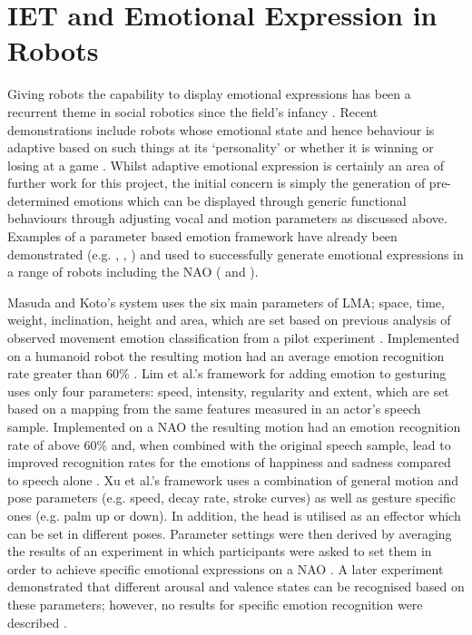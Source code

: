 \documentclass[11pt,a4paper]{report}
\begin{document}
\section{IET and Emotional Expression in Robots}
Giving robots the capability to display emotional expressions has been a recurrent theme in social robotics since the field's infancy \cite{breazeal1999build}. Recent demonstrations include robots whose emotional state and hence behaviour is adaptive based on such things at its `personality' \cite{park2009robot} or whether it is winning or losing at a game \cite{tielman2014adaptive}. Whilst adaptive emotional expression is certainly an area of further work for this project, the initial concern is simply the generation of pre-determined emotions which can be displayed through generic functional behaviours through adjusting vocal and motion parameters as discussed above. Examples of a parameter based emotion framework have already been demonstrated (e.g. \cite{masuda2010motion}, \cite{lim2011converting}, \cite{xu2013mood}) and used to successfully generate emotional expressions in a range of robots including the NAO (\cite{lim2011converting} and \cite{xu2013mood}). 

Masuda and Koto's system uses the six main parameters of LMA; space, time, weight, inclination, height and area, which are set based on previous analysis of observed movement emotion classification from a pilot experiment \cite{masuda2009emotion}. Implemented on a humanoid robot the resulting motion had an average emotion recognition rate greater than 60\% \cite{masuda2010motion}. Lim et al.'s framework for adding emotion to gesturing uses only four parameters: speed, intensity, regularity and extent, which are set based on a mapping from the same features measured in an actor's speech sample. Implemented on a NAO the resulting motion had an emotion recognition rate of above 60\% and, when combined with the original speech sample, lead to improved recognition rates for the emotions of happiness and sadness compared to speech alone \cite{lim2011converting}. Xu et al.'s framework uses a combination of general motion and pose parameters (e.g. speed, decay rate, stroke curves) as well as gesture specific ones (e.g. palm up or down). In addition, the head is utilised as an effector which can be set in different poses. Parameter settings were then derived by averaging the results of an experiment in which participants were asked to set them in order to achieve specific emotional expressions on a NAO \cite{xu2013mood}. A later experiment demonstrated that different arousal and valence states can be recognised based on these parameters; however, no results for specific emotion recognition were described \cite{xu2013bodily}.
\end{document}
